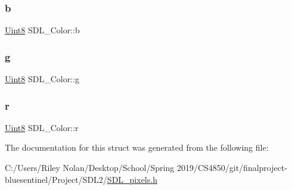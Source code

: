 \subsubsection{\texorpdfstring{b}{b}}
{\footnotesize\ttfamily \mbox{\hyperlink{_s_d_l__stdinc_8h_a2944638813a090aa23e62f4da842c3e2}{Uint8}} S\+D\+L\+\_\+\+Color\+::b}

\mbox{\label{struct_s_d_l___color_ae29d881bf740cfa7078b36e07f85d298}} 
\subsubsection{\texorpdfstring{g}{g}}
{\footnotesize\ttfamily \mbox{\hyperlink{_s_d_l__stdinc_8h_a2944638813a090aa23e62f4da842c3e2}{Uint8}} S\+D\+L\+\_\+\+Color\+::g}

\mbox{\label{struct_s_d_l___color_a0bb975b6829524133fdd3c6060cfa63d}} 
\subsubsection{\texorpdfstring{r}{r}}
{\footnotesize\ttfamily \mbox{\hyperlink{_s_d_l__stdinc_8h_a2944638813a090aa23e62f4da842c3e2}{Uint8}} S\+D\+L\+\_\+\+Color\+::r}



The documentation for this struct was generated from the following file\+:\begin{DoxyCompactItemize}
\item 
C\+:/\+Users/\+Riley Nolan/\+Desktop/\+School/\+Spring 2019/\+C\+S4850/git/finalproject-\/bluesentinel/\+Project/\+S\+D\+L2/\mbox{\hyperlink{_s_d_l__pixels_8h}{S\+D\+L\+\_\+pixels.\+h}}\end{DoxyCompactItemize}
